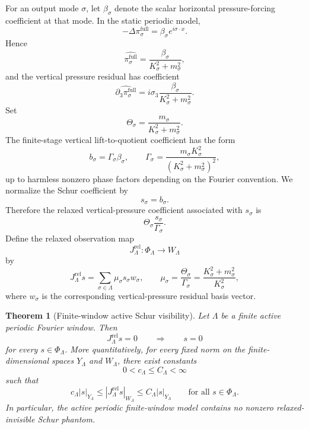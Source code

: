 \documentclass[11pt]{article}
\numberwithin{equation}{section}
\newtheorem{theorem}{Theorem}[section]
\begin{document}
For an output mode \(\sigma\), let \(\beta_\sigma\) denote the scalar horizontal pressure-forcing coefficient at that mode.  In the static periodic model,
\[
        -\Delta \pi_\sigma^{\mathrm{full}}
        =\beta_\sigma e^{i\sigma\cdot x}.
\]
Hence
\[
        \widehat{\pi_\sigma^{\mathrm{full}}}
        =\frac{\beta_\sigma}{K_\sigma^2+m_\sigma^2},
\]
and the vertical pressure residual has coefficient
\[
        \widehat{\partial_3\pi_\sigma^{\mathrm{full}}}
        =i\sigma_3\frac{\beta_\sigma}{K_\sigma^2+m_\sigma^2}.
\]
Set
\[
        \Theta_\sigma
        =\frac{m_\sigma}{K_\sigma^2+m_\sigma^2}.
\]
The finite-stage vertical lift-to-quotient coefficient has the form
\[
        b_\sigma=\Gamma_\sigma\beta_\sigma,
        \qquad
        \Gamma_\sigma
        =\frac{m_\sigma K_\sigma^2}{(K_\sigma^2+m_\sigma^2)^2},
\]
up to harmless nonzero phase factors depending on the Fourier convention.  We normalize the Schur coefficient by
\[
        s_\sigma=b_\sigma.
\]
Therefore the relaxed vertical-pressure coefficient associated with \(s_\sigma\) is
\[
        \Theta_\sigma\frac{s_\sigma}{\Gamma_\sigma}.
\]
Define the relaxed observation map
\[
        J_\Lambda^{\mathrm{rel}}:\Phi_\Lambda\to W_\Lambda
\]
by
\begin{equation}\label{eq:finite-window-Jrel-diagonal}
        J_\Lambda^{\mathrm{rel}}s
        =\sum_{\sigma\in\Lambda}\mu_\sigma s_\sigma w_\sigma,
        \qquad
        \mu_\sigma
        =\frac{\Theta_\sigma}{\Gamma_\sigma}
        =\frac{K_\sigma^2+m_\sigma^2}{K_\sigma^2},
\end{equation}
where \(w_\sigma\) is the corresponding vertical-pressure residual basis vector.

\begin{theorem}[Finite-window active Schur visibility]\label{thm:finite-window-active-Schur-visibility}
Let \(\Lambda\) be a finite active periodic Fourier window.  Then
\[
        J_\Lambda^{\mathrm{rel}}s=0
        \qquad\Longrightarrow\qquad
        s=0
\]
for every \(s\in\Phi_\Lambda\).  More quantitatively, for every fixed norm on the finite-dimensional spaces \(Y_\Lambda\) and \(W_\Lambda\), there exist constants
\[
        0<c_\Lambda\le C_\Lambda<\infty
\]
such that
\[
        c_\Lambda |s|_{Y_\Lambda}
        \le
        |J_\Lambda^{\mathrm{rel}}s|_{W_\Lambda}
        \le
        C_\Lambda |s|_{Y_\Lambda}
        \qquad
        \text{for all }s\in\Phi_\Lambda.
\]
In particular, the active periodic finite-window model contains no nonzero relaxed-invisible Schur phantom.
\end{theorem}
\end{document}
